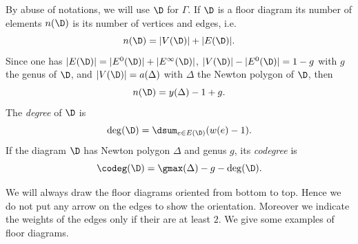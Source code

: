 By abuse of notations, we will use $\D$ for $\Gamma$. If $\D$ is a floor diagram its number of elements $n(\D)$ is its number of vertices and edges, i.e.  
\[ n(\D) = |V(\D)| + |E(\D) |. \]
Since one has $|E(\D)| = |E^0(\D)| + |E^\infty(\D)|$, $|V(\D)| - |E^0(\D)| = 1-g$ with $g$ the genus of $\D$, and $|V(\D)| = a(\Delta)$ with $\Delta$ the Newton polygon of $\D$, then 
\[ n(\D) = y(\Delta)-1+g . \]
The \emph{degree} of $\D$ is 
    \[ \deg(\D) = \dsum_{e\in E(\D)} (w(e)-1) . \]
If the diagram $\D$ has Newton polygon $\Delta$ and genus $g$, its \emph{codegree} is
    \[ \codeg(\D) = \gmax(\Delta) -g-\deg(\D) . \]

We will always draw the floor diagrams oriented from bottom to top. Hence we do not put any arrow on the edges to show the orientation. Moreover we indicate the weights of the edges only if their are at least $2$. We give some examples of floor diagrams.


